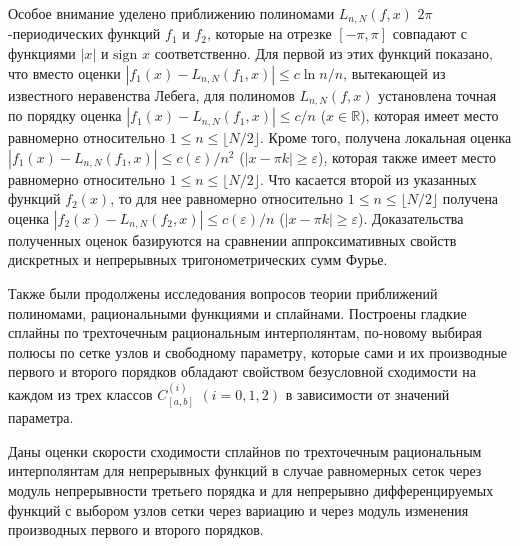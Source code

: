 Особое внимание уделено приближению полиномами $L_{n,N}(f,x)$ $2\pi$-периодических функций $f_1$ и $f_2$, которые на отрезке $[-\pi, \pi]$ совпадают с функциями $|x|$ и $\mbox{sign } x$ соответственно.
Для первой из этих функций показано, что вместо оценки $\left|f_{1}(x)-L_{n,N}(f_{1},x)\right| \leq c\ln n/n$,
вытекающей из известного неравенства Лебега, для полиномов $L_{n,N}(f,x)$ установлена точная по порядку оценка
$\left|f_{1}(x)-L_{n,N}(f_{1},x)\right| \leq c/n$ ($x \in \mathbb{R}$), которая имеет место равномерно относительно $1 \leq n \leq \lfloor N/2\rfloor$.
Кроме того, получена локальная оценка  $\left|f_{1}(x)-L_{n,N}(f_{1},x)\right| \leq c(\varepsilon)/n^2$ ($\left|x - \pi k\right| \geq \varepsilon$), которая также имеет место равномерно относительно $1 \leq n \leq \lfloor N/2\rfloor$.
Что касается второй из указанных функций $f_2(x)$, то для нее равномерно относительно $1 \leq n \leq \lfloor N/2\rfloor$ получена оценка
$\left|f_{2}(x)-L_{n,N}(f_{2},x)\right| \leq c(\varepsilon)/n$ ($\left|x - \pi k\right| \geq \varepsilon$).
Доказательства полученных оценок базируются на сравнении аппроксимативных свойств дискретных и непрерывных тригонометрических сумм Фурье.



Также были продолжены исследования вопросов теории приближений полиномами, рациональными функциями и сплайнами.
Построены гладкие сплайны по трехточечным рациональным интерполянтам, по-новому выбирая полюсы по сетке узлов и свободному параметру, которые сами и их производные первого и второго порядков обладают свойством безусловной сходимости на каждом из трех классов $C_{[a,b]}^{(i)}$ $(i=0,1,2)$ в зависимости от значений параметра.



Даны оценки скорости сходимости сплайнов по трехточечным рациональным
интерполянтам для непрерывных функций в случае равномерных сеток через модуль
 непрерывности  третьего порядка и для непрерывно дифференцируемых функций с выбором узлов сетки через вариацию и через модуль изменения производных первого и второго порядков.








